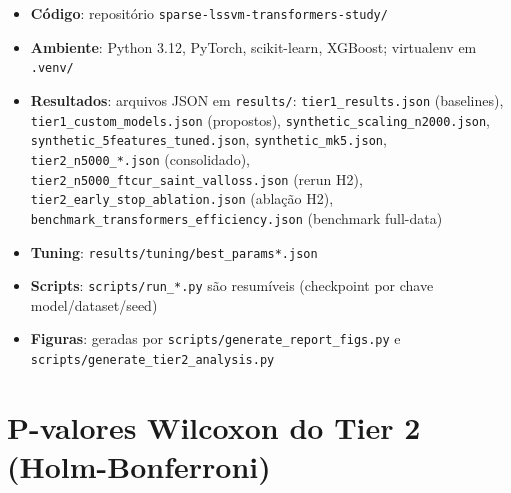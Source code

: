 \documentclass[12pt,a4paper]{article}
\begin{document}
\begin{itemize}\sloppy
  \item \textbf{Código}: repositório \texttt{sparse-lssvm-transformers-study/}
  \item \textbf{Ambiente}: Python 3.12, PyTorch, scikit-learn, XGBoost;
        virtualenv em \texttt{.venv/}
  \item \textbf{Resultados}: arquivos JSON em \texttt{results/}:
        \texttt{tier1\_results.json} (baselines),
        \texttt{tier1\_custom\_models.json} (propostos),
        \texttt{synthetic\_scaling\_n2000.json},
        \texttt{synthetic\_5features\_tuned.json},
        \texttt{synthetic\_mk5.json},
        \texttt{tier2\_n5000\_*.json} (consolidado),
        \texttt{tier2\_n5000\_ftcur\_saint\_valloss.json} (rerun H2),
        \texttt{tier2\_early\_stop\_ablation.json} (ablação H2),
        \texttt{benchmark\_transformers\_efficiency.json}
        (benchmark full-data)
  \item \textbf{Tuning}: \texttt{results/tuning/best\_params*.json}
  \item \textbf{Scripts}: \texttt{scripts/run\_*.py} são resumíveis
        (checkpoint por chave model/dataset/seed)
  \item \textbf{Figuras}: geradas por \texttt{scripts/generate\_report\_figs.py}
        e \texttt{scripts/generate\_tier2\_analysis.py}
\end{itemize}

\section{P-valores Wilcoxon do Tier 2 (Holm-Bonferroni)}


\end{document}
